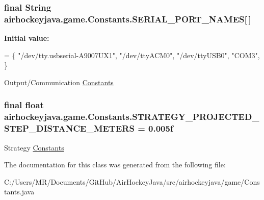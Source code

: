 \subsubsection[{S\+E\+R\+I\+A\+L\+\_\+\+P\+O\+R\+T\+\_\+\+N\+A\+M\+E\+S}]{\setlength{\rightskip}{0pt plus 5cm}final String airhockeyjava.\+game.\+Constants.\+S\+E\+R\+I\+A\+L\+\_\+\+P\+O\+R\+T\+\_\+\+N\+A\+M\+E\+S\mbox{[}$\,$\mbox{]}\hspace{0.3cm}{\ttfamily [static]}}\label{classairhockeyjava_1_1game_1_1_constants_a538ce6fb82e0fba366842a33962fc283}
{\bfseries Initial value\+:}
\begin{DoxyCode}
= \{ \textcolor{stringliteral}{"/dev/tty.usbserial-A9007UX1"}, 
            \textcolor{stringliteral}{"/dev/ttyACM0"}, 
            \textcolor{stringliteral}{"/dev/ttyUSB0"}, 
            \textcolor{stringliteral}{"COM3"}, 
    \}
\end{DoxyCode}
Output/\+Communication \hyperlink{classairhockeyjava_1_1game_1_1_constants}{Constants} \hypertarget{classairhockeyjava_1_1game_1_1_constants_a157340a611bfafdfaa28377b19d4146f}{}
\subsubsection[{S\+T\+R\+A\+T\+E\+G\+Y\+\_\+\+P\+R\+O\+J\+E\+C\+T\+E\+D\+\_\+\+S\+T\+E\+P\+\_\+\+D\+I\+S\+T\+A\+N\+C\+E\+\_\+\+M\+E\+T\+E\+R\+S}]{\setlength{\rightskip}{0pt plus 5cm}final float airhockeyjava.\+game.\+Constants.\+S\+T\+R\+A\+T\+E\+G\+Y\+\_\+\+P\+R\+O\+J\+E\+C\+T\+E\+D\+\_\+\+S\+T\+E\+P\+\_\+\+D\+I\+S\+T\+A\+N\+C\+E\+\_\+\+M\+E\+T\+E\+R\+S = 0.\+005f\hspace{0.3cm}{\ttfamily [static]}}\label{classairhockeyjava_1_1game_1_1_constants_a157340a611bfafdfaa28377b19d4146f}
Strategy \hyperlink{classairhockeyjava_1_1game_1_1_constants}{Constants} 

The documentation for this class was generated from the following file\+:\begin{DoxyCompactItemize}
\item 
C\+:/\+Users/\+M\+R/\+Documents/\+Git\+Hub/\+Air\+Hockey\+Java/src/airhockeyjava/game/Constants.\+java\end{DoxyCompactItemize}
